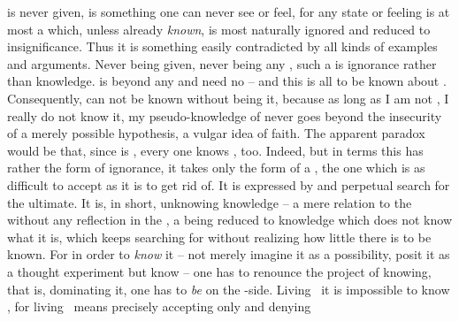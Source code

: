  is never given,  is something one can never see or feel, for
any  state or feeling is at most a  which, unless already
{\em known}, is most naturally ignored and reduced to insignificance. Thus
it is something easily contradicted by all kinds of  examples and
arguments.
Never being given, never being any  , such a  is
ignorance rather than knowledge.     is
beyond any  and need no  -- and this is all to be known
about . Consequently,  can not be known without being it,
because as long as I am not , I really do not know it, my 
pseudo-knowledge of  never goes beyond the insecurity of a merely
possible hypothesis, a vulgar idea of faith. The apparent paradox would be that,
since  is , every one knows , too.
Indeed, but in  terms this  has rather the
form of ignorance, it takes only the form of a ,
the one which is as difficult to accept as it is to get rid of. It is expressed
by  and perpetual search for the ultimate. It is, in short, 
unknowing knowledge -- a mere relation to the  without any
reflection in the , a being reduced to knowledge which does not
know what it is, which keeps searching for  without realizing how
little there is to be known. For in order to {\em know} it -- not merely imagine
it as a possibility, posit it as a thought experiment but  know --
one has to renounce the project of  knowing, that is, dominating
it, one has to {\em be} on the \yes-side.  Living \No\ it is impossible to know
\Yes, for living \No\ means precisely accepting only  and denying
